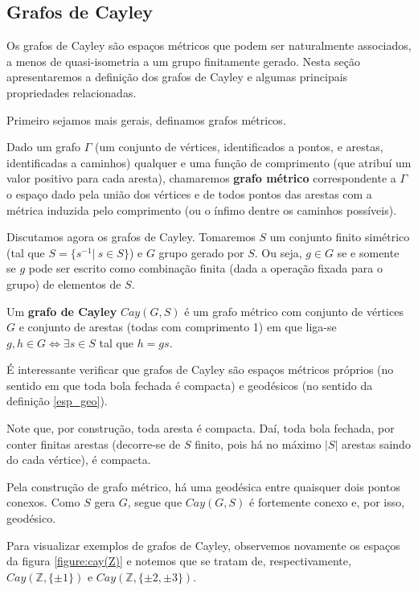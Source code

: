 \subsection{Grafos de Cayley}
Os grafos de Cayley são espaços métricos que podem ser naturalmente associados, a menos de quasi-isometria a um grupo finitamente gerado. Nesta seção apresentaremos a definição dos grafos de Cayley e algumas principais propriedades relacionadas.

Primeiro sejamos mais gerais, definamos grafos métricos.

\begin{definition}
Dado um grafo $\Gamma$ (um conjunto de vértices, identificados a pontos, e arestas, identificadas a caminhos) qualquer e uma função de comprimento (que atribuí um valor positivo para cada aresta), chamaremos \textbf{grafo métrico} correspondente a $\Gamma$ o espaço dado pela união dos vértices e de todos pontos das arestas com a métrica induzida pelo comprimento (ou o ínfimo dentre os caminhos possíveis).
\end{definition}

Discutamos agora os grafos de Cayley. Tomaremos $S$ um conjunto finito simétrico (tal que $S = \{ s^{-1} | \ s \in S \}$) e $G$ grupo gerado por $S$. Ou seja, $g \in G$ se e somente se $g$ pode ser escrito como combinação finita (dada a operação fixada para o grupo) de elementos de $S$.

\begin{definition}
Um \textbf{grafo de Cayley} $Cay(G, S)$ é um grafo métrico com conjunto de vértices $G$ e conjunto de arestas (todas com comprimento 1) em que liga-se $g,h \in G \iff \exists s \in S$ tal que $h=gs$.
\end{definition}

É interessante verificar que grafos de Cayley são espaços métricos próprios (no sentido em que toda bola fechada é compacta) e geodésicos (no sentido da definição \ref{esp_geo}).

Note que, por construção, toda aresta é compacta. Daí, toda bola fechada, por conter finitas arestas (decorre-se de $S$ finito, pois há no máximo $|S|$ arestas saindo do cada vértice), é compacta.

Pela construção de grafo métrico, há uma geodésica entre quaisquer dois pontos conexos. Como $S$ gera $G$, segue que $Cay(G,S)$ é fortemente conexo e, por isso, geodésico.

Para visualizar exemplos de grafos de Cayley, observemos novamente os espaços da figura \ref{figure:cay(Z)} e notemos que se tratam de, respectivamente, $Cay(\mathbb{Z}, \{ \pm 1 \})$ e $Cay(\mathbb{Z}, \{ \pm 2, \pm 3 \})$.

